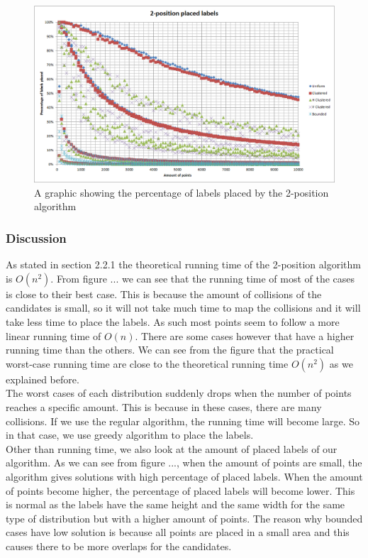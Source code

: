 \documentclass[crop=false,a4paper,oneside,11pt]{standalone}
\begin{document}
\begin{figure}[h!]
 \centering
  \centerline{\includegraphics[scale = 0.5]{2PosLabelsPlaced.png}}
  \caption{A graphic showing the percentage of labels placed by the 2-position algorithm}
 \end{figure}
\subsubsection{Discussion}
As stated in section 2.2.1 the theoretical running time of the 2-position algorithm is $O(n^2)$. From figure ... we can see that the running time of most of the cases is close to their best case. This is because the amount of collisions of the candidates is small, so it will not take much time to map the collisions and it will take less time to place the labels. As such most points seem to follow a more linear running time of $O(n)$. There are some cases however that have a higher running time than the others. We can see from the figure that the practical worst-case running time are close to the theoretical running time $O(n^2)$ as we explained before. \\
The worst cases of each distribution suddenly drops when the number of points reaches a specific amount. This is because in these cases, there are many collisions. If we use the regular algorithm, the running time will become large. So in that case, we use greedy algorithm to place the labels.\\
Other than running time, we also look at the amount of placed labels of our algorithm. As we can see from figure ..., when the amount of points are small, the algorithm gives solutions with high percentage of placed labels. When the amount of points become higher, the percentage of placed labels will become lower. This is normal as the labels have the same height and the same width for the same type of distribution but with a higher amount of points. The reason why bounded cases have low solution is because all points are placed in a small area and this causes there to be more overlaps for the candidates.\\
\end{document}
